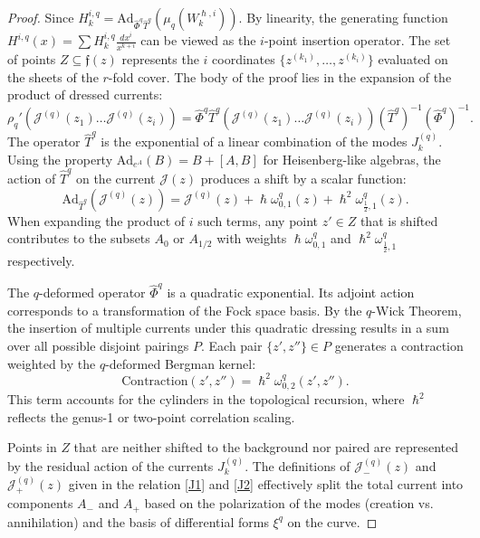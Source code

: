 \documentclass[reqno,11pt]{amsart}
\theoremstyle{plain}
\theoremstyle{definition}
\theoremstyle{remark}
\numberwithin{equation}{section}
\newcommand{\1}{\mathds{1}}
\newcommand{\2}{\frac{1}{2}}
\begin{document}
{\begin{proof}
									{Since $H^{i,q}_k = \text{Ad}_{\hat{\Phi}^q \hat{T}^q} (\mu_q(W^{\hslash,i}_k))$. By linearity, the generating function $H^{i,q}(x) = \sum H^{i,q}_k \frac{dx^i}{x^{k+i}}$ can be viewed as 
										the $i$-point insertion operator. The set of points $Z \subseteq \mathfrak{f}(z)$ represents the $i$ coordinates $\{z^{(k_1)}, \dots, z^{(k_i)}\}$ evaluated on the sheets of the $r$-fold cover. The body of the proof lies in the expansion of the product of dressed currents:
										\begin{equation}
											\rho_q'(\mathcal{J}^{(q)}(z_1) \dots \mathcal{J}^{(q)}(z_i)) = \hat{\Phi}^q \hat{T}^q \left( \mathcal{J}^{(q)}(z_1) \dots \mathcal{J}^{(q)}(z_i) \right) (\hat{T}^q)^{-1} (\hat{\Phi}^q)^{-1}.
									\end{equation}}
									{The operator $\hat{T}^q$ is the exponential of a linear combination of the modes $J^{(q)}_k$. Using the property $\text{Ad}_{e^A}(B) = B + [A,B]$ for Heisenberg-like algebras, the action of $\hat{T}^q$ on the current $\mathcal{J}(z)$ produces a shift by a scalar function:
										\begin{equation}
											\text{Ad}_{\hat{T}^q}(\mathcal{J}^{(q)}(z)) = \mathcal{J}^{(q)}(z) + \hslash \omega^q_{0,1}(z) + \hslash^2 \omega^q_{\frac{1}{2},1}(z).
										\end{equation}
										When expanding the product of $i$ such terms, any point $z' \in Z$ that is shifted  contributes to the subsets $A_0$ or $A_{1/2}$ with weights $\hslash \omega^q_{0,1}$ and $\hslash^2 \omega^q_{\frac{1}{2},1}$ respectively.}
									
									{The $q$-deformed operator $\hat{\Phi}^q$ is a quadratic exponential. Its adjoint action corresponds to a transformation of the Fock space basis. By the $q$-Wick Theorem, the insertion of multiple currents under this quadratic dressing results in a sum over all possible disjoint pairings $P$. Each pair $\{z', z''\} \in P$ generates a contraction weighted by the $q$-deformed Bergman kernel:
										\begin{equation}
											\text{Contraction}(z', z'') = \hslash^2 \omega^q_{0,2}(z', z'').
										\end{equation}
										This term accounts for the cylinders in the topological recursion, where $\hslash^2$ reflects the genus-1 or two-point correlation scaling.}
									
									{Points in $Z$ that are neither shifted to the background nor paired are represented by the residual action of the currents $J^{(q)}_k$. The definitions of $\mathcal{J}^{(q)}_-(z)$ and $\mathcal{J}^{(q)}_+(z)$ given in the relation \eqref{J1} and \eqref{J2}
										effectively split the total current into components $A_-$ and $A_+$ based on the polarization of the modes (creation vs. annihilation) and the basis of differential forms $\xi^q$ on the curve.}
									

\end{proof}}
\end{document}
